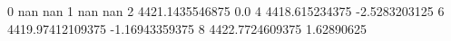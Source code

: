 0 nan nan
1 nan nan
2 4421.1435546875 0.0
4 4418.615234375 -2.5283203125
6 4419.97412109375 -1.16943359375
8 4422.7724609375 1.62890625
